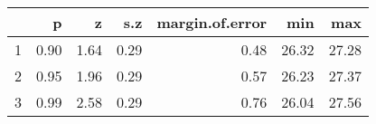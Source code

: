 \documentclass[landscape]{exam}
\begin{document}
\begin{description}
\begin{enumerate}[(a)]
          \begin{table}[ht]
          \centering
          \begin{tabular}{rrrrrrr}
            \toprule
              & p    & z    & s.z  & margin.of.error & min   & max \\
            \midrule
            1 & 0.90 & 1.64 & 0.29 & 0.48            & 26.32 & 27.28 \\
            2 & 0.95 & 1.96 & 0.29 & 0.57            & 26.23 & 27.37 \\
            3 & 0.99 & 2.58 & 0.29 & 0.76            & 26.04 & 27.56 \\
            \bottomrule
          \end{tabular}
          \end{table}
      \end{enumerate}

  \end{description}
\end{document}
